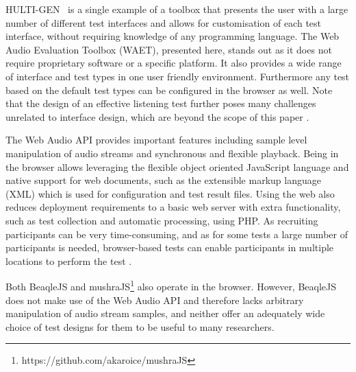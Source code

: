 \documentclass{sig-alternate}
\begin{document}
	HULTI-GEN~\cite{hultigen} is a single example of a toolbox that presents the user with a large number of different test interfaces and allows for customisation of each test interface, without requiring knowledge of any programming language. The Web Audio Evaluation Toolbox (WAET), presented here, stands out as it does not require proprietary software or a specific platform. It also provides a wide range of interface and test types in one user friendly environment. Furthermore any test based on the default test types can be configured in the browser as well. Note that the design of an effective listening test further poses many challenges unrelated to interface design, which are beyond the scope of this paper \cite{bech}. 

	The Web Audio API provides important features including sample level manipulation of audio streams \cite{schoeffler2015mushra} and synchronous and flexible playback. Being in the browser allows leveraging the flexible object oriented JavaScript language and native support for web documents, such as the extensible markup language (XML) which is used for configuration and test result files. Using the web also reduces deployment requirements to a basic web server with extra functionality, such as test collection and automatic processing, using PHP. As recruiting participants can be very time-consuming, and as for some tests a large number of participants is needed, browser-based tests can enable participants in multiple locations to perform the test \cite{schoeffler2015mushra}.

	Both BeaqleJS \cite{beaqlejs} and mushraJS\footnote{https://github.com/akaroice/mushraJS} also operate in the browser. However, BeaqleJS does not make use of the Web Audio API and therefore lacks arbitrary manipulation of audio stream samples, and neither offer an adequately wide choice of test designs for them to be useful to many researchers. %
	
\end{document}
